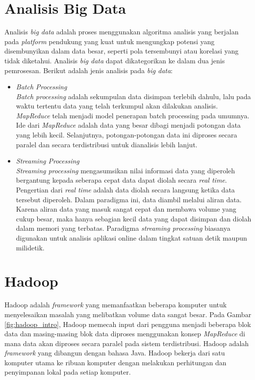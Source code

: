 \section{Analisis Big Data}
\noindent Analisis \textit{big data} adalah proses menggunakan algoritma analisis yang berjalan pada \textit{platform} pendukung yang kuat untuk mengungkap potensi yang disembunyikan dalam data besar, seperti pola tersembunyi atau korelasi yang tidak diketahui. Analisis \textit{big data} dapat dikategorikan ke dalam dua jenis pemrosesan. Berikut adalah jenis analisis pada \textit{big data}:

\begin{itemize}
\item 
\textit{Batch Processing}\\
\textit{Batch processing} adalah sekumpulan data disimpan terlebih dahulu, lalu pada waktu tertentu data yang telah terkumpul akan dilakukan analisis. \textit{MapReduce} telah menjadi model penerapan batch processing pada umumnya. Ide dari \textit{MapReduce} adalah data yang besar dibagi menjadi potongan data yang lebih kecil. Selanjutnya, potongan-potongan data ini diproses secara paralel dan secara terdistribusi untuk dianalisis lebih lanjut. 

\item
\textit{Streaming Processing}\\
\textit{Streaming processing} mengasumsikan nilai informasi data yang diperoleh bergantung kepada seberapa cepat data dapat diolah secara \textit{real time}. Pengertian dari \textit{real time} adalah data diolah secara langsung ketika data tersebut diperoleh. Dalam paradigma ini, data diambil melalui aliran data. Karena aliran data yang masuk sangat cepat dan membawa volume yang cukup besar, maka hanya sebagian kecil data yang dapat disimpan dan diolah dalam memori yang terbatas. Paradigma \textit{streaming processing} biasanya digunakan untuk analisis aplikasi online dalam tingkat satuan detik maupun milidetik.
\end{itemize}

\newpage
\section{Hadoop}
Hadoop adalah \textit{framework} yang memanfaatkan beberapa komputer untuk menyelesaikan masalah yang melibatkan volume data sangat besar. Pada Gambar \ref{fig:hadoop_intro}, Hadoop memecah input dari pengguna menjadi beberapa blok data dan masing-masing blok data diproses menggunakan konsep \textit{MapReduce} di mana data akan diproses secara paralel pada sistem terdistribusi. Hadoop adalah \textit{framework} yang dibangun dengan bahasa Java. Hadoop bekerja dari satu komputer utama ke ribuan komputer dengan melakukan perhitungan dan penyimpanan lokal pada setiap komputer. 

